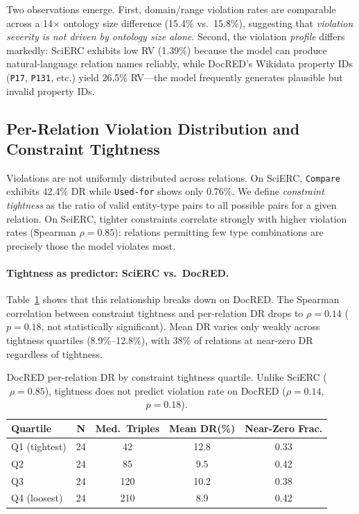 \documentclass[11pt,a4paper]{article}
\begin{document}
Two observations emerge.
First, domain/range violation rates are comparable across a 14$\times$ ontology size difference (15.4\% vs.\ 15.8\%), suggesting that \emph{violation severity is not driven by ontology size alone}.
Second, the violation \emph{profile} differs markedly: SciERC exhibits low RV (1.39\%) because the model can produce natural-language relation names reliably, while DocRED's Wikidata property IDs (\texttt{P17}, \texttt{P131}, etc.) yield 26.5\% RV---the model frequently generates plausible but invalid property IDs.

\subsection{Per-Relation Violation Distribution and Constraint Tightness}
\label{sec:perrel}

Violations are not uniformly distributed across relations.
On SciERC, \texttt{Compare} exhibits 42.4\% DR while \texttt{Used-for} shows only 0.76\%.
We define \emph{constraint tightness} as the ratio of valid entity-type pairs to all possible pairs for a given relation.
On SciERC, tighter constraints correlate strongly with higher violation rates (Spearman $\rho{=}0.85$): relations permitting few type combinations are precisely those the model violates most.

\paragraph{Tightness as predictor: SciERC vs.\ DocRED.}
Table~\ref{tab:tightness_quartile} shows that this relationship breaks down on DocRED.
The Spearman correlation between constraint tightness and per-relation DR drops to $\rho{=}0.14$ ($p{=}0.18$, not statistically significant).
Mean DR varies only weakly across tightness quartiles (8.9\%--12.8\%), with 38\% of relations at near-zero DR regardless of tightness.

\begin{table}[t]
\centering
\caption{DocRED per-relation DR by constraint tightness quartile. Unlike SciERC ($\rho{=}0.85$), tightness does not predict violation rate on DocRED ($\rho{=}0.14$, $p{=}0.18$).}
\label{tab:tightness_quartile}
\begin{tabular}{lcccc}
\toprule
\textbf{Quartile} & \textbf{N} & \textbf{Med.\ Triples} & \textbf{Mean DR(\%)} & \textbf{Near-Zero Frac.} \\
\midrule
Q1 (tightest) & 24 & 42  & 12.8 & 0.33 \\
Q2             & 24 & 85  &  9.5 & 0.42 \\
Q3             & 24 & 120 & 10.2 & 0.38 \\
Q4 (loosest)   & 24 & 210 &  8.9 & 0.42 \\
\bottomrule
\end{tabular}
\end{table}
\end{document}
